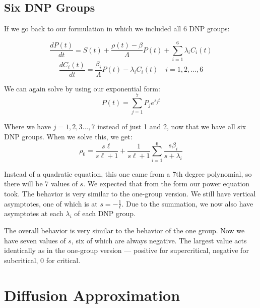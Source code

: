\documentclass[letter]{article}
\begin{document}
\subsection{Six DNP Groups}

If we go back to our formulation in which we included all 6 DNP
groups:

\begin{equation*}
      \frac{dP(t)}{dt}= S(t) + \frac{\rho(t)-\beta}{\Lambda}P(t)+\sum^6_{i=1}\lambda_iC_i(t)
\end{equation*}
\begin{equation*}
    \frac{dC_i(t)}{dt}=\frac{\beta_i}{\Lambda}P(t)-\lambda_iC_i(t)\quad i=1,2,\ldots,6
\end{equation*}

We can again solve by using our exponential form:
\begin{equation*}
  P(t)=\sum^7_{j=1}P_je^{s_jt}
\end{equation*}

Where we have $j=1,2,3\ldots,7$ instead of just 1 and 2, now that we
have all six DNP groups. When we solve this, we get:
\begin{equation*}
  \rho_0=\frac{s\ell}{s\ell+1}+\frac{1}{s\ell+1}\sum^6_{i=1}\frac{s\beta_i}{s+\lambda_i}
\end{equation*}

Instead of a quadratic equation, this one came from a 7th degree
polynomial, so there will be 7 values of $s$. We expected that from
the form our power equation took. The behavior is very similar to the
one-group version. We still have vertical asymptotes, one of which is
at $s=-\frac{1}{\ell}$. Due to the summation, we now also have
asymptotes at each $\lambda_i$ of each DNP group.

\vspace{10pt}
The overall behavior is very similar to the behavior of the one
group. Now we have seven values of $s$, six of which are always
negative. The largest value acts identically as in the one-group
version --- positive for supercritical, negative for subcritical, 0
for critical.

\section{Diffusion Approximation}



\end{document}
